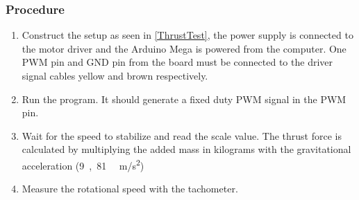 \subsubsection{Procedure}
\begin{enumerate}
	\item Construct the setup as seen in \autoref{ThrustTest}, the power supply is connected to the motor driver and the Arduino Mega is powered from the computer. One PWM pin and GND pin from the board must be connected to the driver signal cables yellow and brown respectively. 
	\item Run the program. It should generate a fixed duty PWM signal in the PWM pin.
	\item Wait for the speed to stabilize and read the scale value. The thrust force is calculated by multiplying the added mass in kilograms with the gravitational acceleration (\si{9,81\textbf{ }m/s^2})
	\item Measure the rotational speed with the tachometer.
\end{enumerate}


